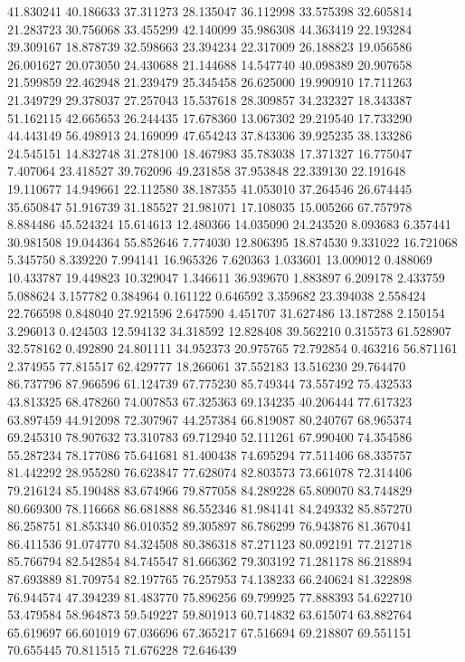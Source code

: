 41.830241
40.186633
37.311273
28.135047
36.112998
33.575398
32.605814
21.283723
30.756068
33.455299
42.140099
35.986308
44.363419
22.193284
39.309167
18.878739
32.598663
23.394234
22.317009
26.188823
19.056586
26.001627
20.073050
24.430688
21.144688
14.547740
40.098389
20.907658
21.599859
22.462948
21.239479
25.345458
26.625000
19.990910
17.711263
21.349729
29.378037
27.257043
15.537618
28.309857
34.232327
18.343387
51.162115
42.665653
26.244435
17.678360
13.067302
29.219540
17.733290
44.443149
56.498913
24.169099
47.654243
37.843306
39.925235
38.133286
24.545151
14.832748
31.278100
18.467983
35.783038
17.371327
16.775047
7.407064
23.418527
39.762096
49.231858
37.953848
22.339130
22.191648
19.110677
14.949661
22.112580
38.187355
41.053010
37.264546
26.674445
35.650847
51.916739
31.185527
21.981071
17.108035
15.005266
67.757978
8.884486
45.524324
15.614613
12.480366
14.035090
24.243520
8.093683
6.357441
30.981508
19.044364
55.852646
7.774030
12.806395
18.874530
9.331022
16.721068
5.345750
8.339220
7.994141
16.965326
7.620363
1.033601
13.009012
0.488069
10.433787
19.449823
10.329047
1.346611
36.939670
1.883897
6.209178
2.433759
5.088624
3.157782
0.384964
0.161122
0.646592
3.359682
23.394038
2.558424
22.766598
0.848040
27.921596
2.647590
4.451707
31.627486
13.187288
2.150154
3.296013
0.424503
12.594132
34.318592
12.828408
39.562210
0.315573
61.528907
32.578162
0.492890
24.801111
34.952373
20.975765
72.792854
0.463216
56.871161
2.374955
77.815517
62.429777
18.266061
37.552183
13.516230
29.764470
86.737796
87.966596
61.124739
67.775230
85.749344
73.557492
75.432533
43.813325
68.478260
74.007853
67.325363
69.134235
40.206444
77.617323
63.897459
44.912098
72.307967
44.257384
66.819087
80.240767
68.965374
69.245310
78.907632
73.310783
69.712940
52.111261
67.990400
74.354586
55.287234
78.177086
75.641681
81.400438
74.695294
77.511406
68.335757
81.442292
28.955280
76.623847
77.628074
82.803573
73.661078
72.314406
79.216124
85.190488
83.674966
79.877058
84.289228
65.809070
83.744829
80.669300
78.116668
86.681888
86.552346
81.984141
84.249332
85.857270
86.258751
81.853340
86.010352
89.305897
86.786299
76.943876
81.367041
86.411536
91.074770
84.324508
80.386318
87.271123
80.092191
77.212718
85.766794
82.542854
84.745547
81.666362
79.303192
71.281178
86.218894
87.693889
81.709754
82.197765
76.257953
74.138233
66.240624
81.322898
76.944574
47.394239
81.483770
75.896256
69.799925
77.888393
54.622710
53.479584
58.964873
59.549227
59.801913
60.714832
63.615074
63.882764
65.619697
66.601019
67.036696
67.365217
67.516694
69.218807
69.551151
70.655445
70.811515
71.676228
72.646439
